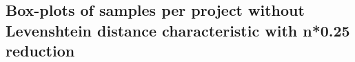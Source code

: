 \begin{appendices}
\section{Box-plots of samples per project without Levenshtein distance characteristic with n*0.25 reduction}
\label{ap:no_distance_25}
\begin{figure}[h]
    \centering
    \qquad
\end{figure}


\end{appendices}
